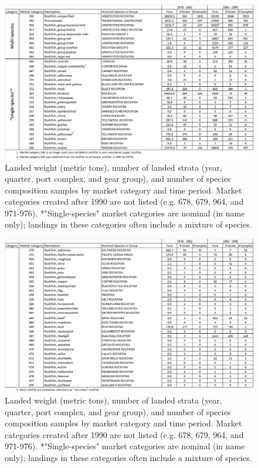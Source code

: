 \documentclass[12pt]{article}
\begin{document}
\begin{landscape}
\begin{figure}
\centering
\includegraphics[width=1.3\textwidth]{./pictures/MC_summary_table_part_1.png}
\caption{Landed weight (metric tons), number of landed strata (year, quarter, 
port complex, and gear group), and number of species composition samples by 
market category and time period. Market categories created after 1990 are not 
listed (e.g. 678, 679, 964, and 971-976). *"Single-species" market categories 
are nominal (in name only); landings in these categories often include a 
mixture of species.}
\label{ej1}
\end{figure}
\end{landscape}

\begin{landscape}
\begin{figure}
\centering
\includegraphics[width=1.3\textwidth]{./pictures/MC_summary_table_part_2.png}
\caption{Landed weight (metric tons), number of landed strata (year, quarter, 
port complex, and gear group), and number of species composition samples by 
market category and time period. Market categories created after 1990 are not 
listed (e.g. 678, 679, 964, and 971-976). *"Single-species" market categories 
are nominal (in name only); landings in these categories often include a 
mixture of species.}
\label{ej2}
\end{figure}
\end{landscape}
\end{document}
